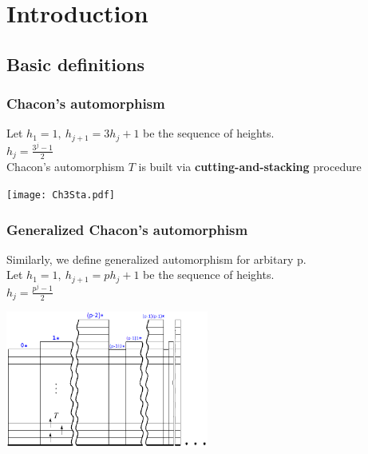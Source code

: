 \section{Introduction}


\subsection{Basic definitions}

\def\B{\mathscr{B}}
\def\Alg{\mathscr{A}}
\def\Mes{\mathscr{M}}
\def\Rajch{\mathscr{R}}
\def\W{\mathscr{W}}
\def\L{\mathscr{L}}
\def\T{\Hat T}
\def\CL{{\mathrm{CL}}}

\begin{frame}

    \frametitle{Chacon's automorphism}
    Let $h_1 = 1,\ h_{j+1} = 3h_j + 1$ be the sequence of heights.\\
    $h_j = \frac{3^j - 1}{2}$\\
    Chacon's automorphism $T$ is built via \textbf{cutting-and-stacking} procedure

  \begin{flushright}
  \texttt{[image: Ch3Sta.pdf]}
  \end{flushright}
\end{frame}

\begin{frame}
    \frametitle{Generalized Chacon's automorphism}
    Similarly, we define generalized automorphism for arbitary p.\\
    Let $h_1 = 1,\ h_{j+1} = ph_j + 1$ be the sequence of heights.\\
    $h_j = \frac{p^j - 1}{2}$\\

  \begin{flushright}
  \includegraphics[height=45mm]{gen_stack.png}
  \end{flushright}
\end{frame}


